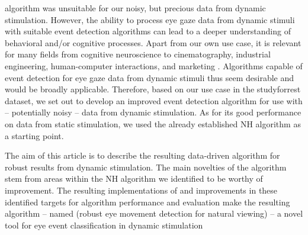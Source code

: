 algorithm was unsuitable for our noisy, but precious data from dynamic
stimulation.  However, the ability to process eye gaze data from dynamic
stimuli with suitable event detection algorithms can lead to a deeper
understanding of behavioral and/or cognitive processes. Apart from our own use
case, it is relevant for many fields from  cognitive neuroscience to
cinematography, industrial engineering, human-computer interactions, and
marketing \citep{Duchowski2002}. Algorithms capable of event detection for eye
gaze data from dynamic stimuli thus seem desirable and would be broadly
applicable. Therefore, based on our use case in the studyforrest dataset, we
set out to develop an improved event detection algorithm for use with --
potentially noisy -- data from dynamic stimulation. As for its good performance
on data from static stimulation, we used the already established NH algorithm
as a starting point.

The aim of this article is to describe the resulting data-driven algorithm for
robust results from dynamic stimulation. The main novelties of the algorithm
stem from areas within the NH algorithm we identified to be worthy of
improvement. The resulting implementations of and improvements in these
identified targets for algorithm performance and evaluation make the resulting
algorithm -- named \remodnav (robust eye movement detection for natural
viewing) -- a novel tool for eye event classification in dynamic stimulation

